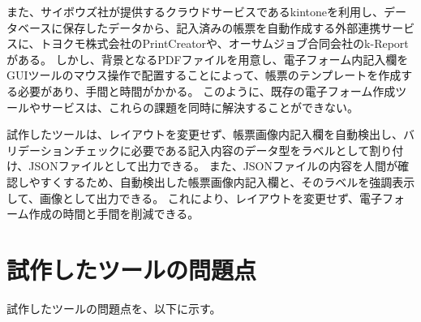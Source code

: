 また、サイボウズ社が提供するクラウドサービスであるkintone\cite{kintone}を利用し、データベースに保存したデータから、記入済みの帳票を自動作成する外部連携サービスに、トヨクモ株式会社のPrintCreator\cite{PrintCreator}や、オーサムジョブ合同会社のk-Report\cite{k-Report}がある。
しかし、背景となるPDFファイルを用意し、電子フォーム内記入欄をGUIツールのマウス操作で配置することによって、帳票のテンプレートを作成する必要があり、手間と時間がかかる。
このように、既存の電子フォーム作成ツールやサービスは、これらの課題を同時に解決することができない。

試作したツールは、レイアウトを変更せず、帳票画像内記入欄を自動検出し、バリデーションチェックに必要である記入内容のデータ型をラベルとして割り付け、JSONファイルとして出力できる。
また、JSONファイルの内容を人間が確認しやすくするため、自動検出した帳票画像内記入欄と、そのラベルを強調表示して、画像として出力できる。
これにより、レイアウトを変更せず、電子フォーム作成の時間と手間を削減できる。

\section{試作したツールの問題点}\label{sec:problems}
試作したツールの問題点を、以下に示す。

